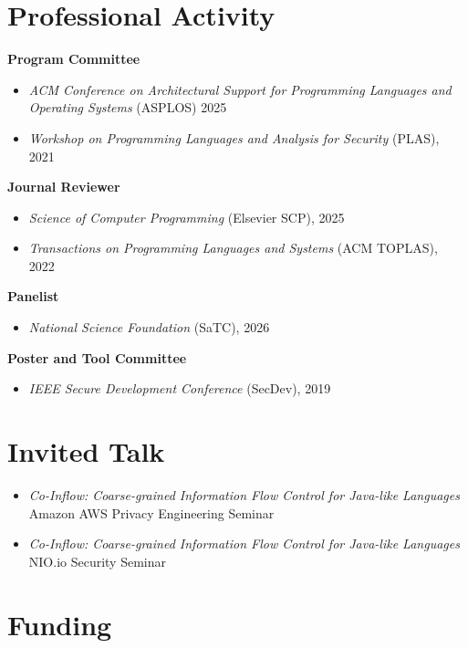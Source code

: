 \documentclass[11pt]{article}
\begin{document}
\section{Professional Activity}
\textbf{Program Committee}
\begin{itemize}
  \item \textit{ACM Conference on Architectural Support for Programming Languages and Operating Systems} (ASPLOS) 2025
  \item \textit{Workshop on Programming Languages and Analysis for Security} (PLAS), 2021
\end{itemize}

\textbf{Journal Reviewer}
\begin{itemize}
\item  \textit{Science of Computer Programming} (Elsevier SCP), 2025
\item  \textit{Transactions on Programming Languages and Systems} (ACM TOPLAS), 2022
\end{itemize}


\textbf{Panelist}
\begin{itemize}
\item  \textit{National Science Foundation} (SaTC), 2026
\end{itemize}

\textbf{Poster and Tool Committee}
\begin{itemize}
\item  \textit{IEEE Secure Development Conference} (SecDev), 2019
\end{itemize}

\section{Invited Talk}


\begin{itemize}
\item \emph{Co-Inflow: Coarse-grained Information Flow Control for Java-like Languages} \\
  Amazon AWS Privacy Engineering Seminar
  

\item   \emph{Co-Inflow: Coarse-grained Information Flow Control for Java-like Languages} \\
  NIO.io Security Seminar 

\end{itemize}


\section{Funding}
\end{document}
